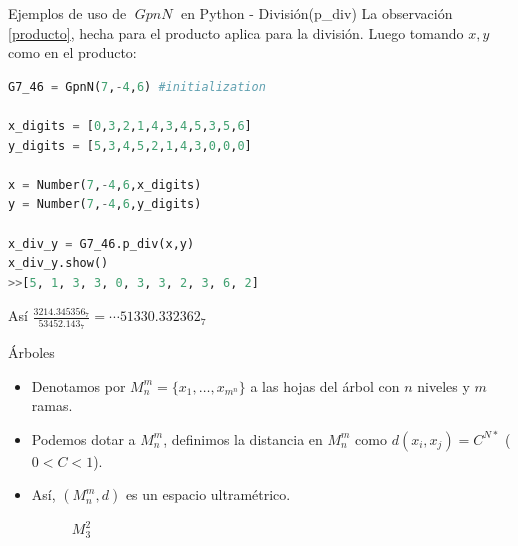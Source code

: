 \documentclass{beamer}
\theoremstyle{definition}
\numberwithin{equation}{section}
\DeclareMathOperator{\gpn}{\mathit{{GpnN}}}
\begin{document}
\begin{frame}[fragile]{Ejemplos de uso de $\gpn$ en Python - División(p\_div) }
La observación \ref{producto}, hecha para el producto aplica para la división. Luego tomando $x,y$ como en el producto:

\begin{lstlisting}[language = Python, caption = división de números en $\mathit{G7\_46}$,basicstyle=\tiny]
G7_46 = GpnN(7,-4,6) #initialization

x_digits = [0,3,2,1,4,3,4,5,3,5,6]
y_digits = [5,3,4,5,2,1,4,3,0,0,0]

x = Number(7,-4,6,x_digits)
y = Number(7,-4,6,y_digits)

x_div_y = G7_46.p_div(x,y)
x_div_y.show()
>>[5, 1, 3, 3, 0, 3, 3, 2, 3, 6, 2]
\end{lstlisting}
Así $\frac{3214.345356_7}{53452.143_7}=\cdots51330.332362_7$
\end{frame}



\begin{frame}[fragile]{Árboles}
\begin{itemize}
	\item Denotamos por $M_n^m=\{x_1, \dots, x_{m^n}\}$ a las hojas del árbol con $n$ niveles y $m$ ramas.
	\item Podemos dotar a $M_n^m$, definimos la distancia en $M_n^m$ como $d   (x_i,x_j)=C^{N*}$ ($0<C<1$).
	\item Así, $   (M_n^m,d)$ es un espacio ultramétrico.
	
		\begin{figure}%
			\centering
			\caption{$M_3^2$}%
		\end{figure}
\end{itemize}	

\end{frame}
\end{document}
